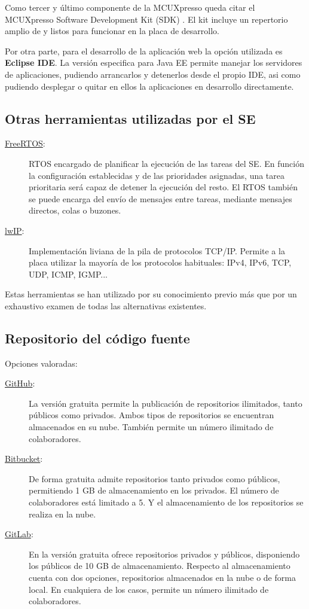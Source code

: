 Como tercer y último componente de la  MCUXpresso queda
citar el MCUXpresso Software Development Kit (SDK) \cite{webpage:sdk}. El kit
incluye un repertorio amplio de  y
 listos para funcionar en la placa de desarrollo.

Por otra parte, para el desarrollo de la aplicación web la opción utilizada es
\textbf{Eclipse IDE}. La versión especifica para Java EE permite manejar los
servidores de aplicaciones, pudiendo arrancarlos y detenerlos desde el propio
IDE, asi como pudiendo desplegar o quitar en ellos la aplicaciones en desarrollo
directamente.

\subsection{Otras herramientas utilizadas por el SE}{\label{sec:otros}}
\begin{description}
  \item[\href{https://www.freertos.org/}{FreeRTOS}:] RTOS encargado de
  planificar la ejecución de las tareas del SE. En función la configuración
  establecidas y de las prioridades asignadas, una tarea prioritaria será capaz
  de detener la ejecución del resto. El RTOS también se puede encarga del envío
  de mensajes entre tareas, mediante mensajes directos, colas o buzones.
  \item[\href{https://savannah.nongnu.org/projects/lwip/}{lwIP}:] Implementación
  liviana de la pila de protocolos TCP/IP. Permite a la placa utilizar la
  mayoría de los protocolos habituales: IPv4, IPv6, TCP, UDP, ICMP, IGMP...
\end{description}

Estas herramientas se han utilizado por su conocimiento previo más que por 
un exhaustivo examen de todas las alternativas existentes.

\subsection{Repositorio del código fuente}{\label{sec:vcs}}
Opciones valoradas:
\begin{description}
  \item[\href{https://github.com/}{GitHub}:] La versión gratuita permite la
  publicación de repositorios ilimitados, tanto públicos como privados. Ambos
  tipos de repositorios se encuentran almacenados en su nube. También permite
  un número ilimitado de colaboradores.
  \item[\href{https://bitbucket.org/}{Bitbucket}:] De forma gratuita admite
  repositorios tanto privados como públicos, permitiendo 1 GB de almacenamiento
  en los privados. El número de colaboradores está limitado a 5. Y el
  almacenamiento de los repositorios se realiza en la nube.
  \item[\href{https://about.gitlab.com/}{GitLab}:] En la versión gratuita ofrece
  repositorios privados y públicos, disponiendo los públicos de 10 GB de
  almacenamiento. Respecto al almacenamiento cuenta con dos opciones,
  repositorios almacenados en la nube o de forma local. En cualquiera de los
  casos, permite un número ilimitado de colaboradores.
\end{description}

